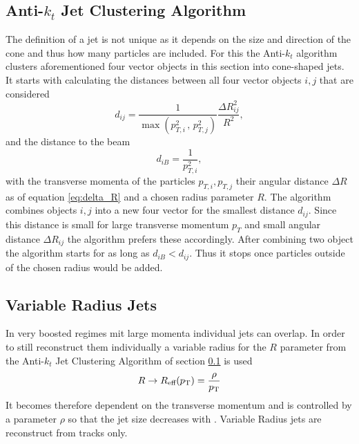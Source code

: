 \subsection{Anti-$k_t$ Jet Clustering Algorithm}\label{sec:anti_kt}
The definition of a jet is not unique as it depends on the size and direction of the cone and thus how many particles are included. For this the Anti-$k_t$ algorithm \citep{cacciari2008anti} clusters aforementioned four vector objects in this section into cone-shaped jets. It starts with calculating the distances between all four vector objects $i,j$ that are considered
\begin{equation}
    d_{ij}=\frac{1}{\max(p_{T,i}^{2}\,,\,p_{T,j}^{2})} \frac{\Delta R_{ij}^2}{R^2},
\end{equation}
and the distance to the beam 
\begin{equation}
    d_{iB}=\frac{1}{p_{T,i}^{2}},
\end{equation}
with the transverse momenta of the particles $p_{T,i},p_{T,j}$ their angular distance $\Delta R$ as of equation \ref{eq:delta_R} and a chosen radius parameter $R$. The algorithm combines objects $i,j$ into a new four vector for the smallest distance $d_{ij}$. Since this distance is small for large transverse momentum $p_T$ and small angular distance $\Delta R_{ij}$ the algorithm prefers these accordingly. After combining two object the algorithm starts for as long as $d_{iB}<d_{ij}$. Thus it stops once particles outside of the chosen radius would be added.

\subsection{Variable Radius Jets}\label{sec:vr_jets}
In very boosted regimes mit large momenta individual jets can overlap. In order to still reconstruct them individually a variable radius for the $R$ parameter from the Anti-$k_t$ Jet Clustering Algorithm of section \ref{sec:anti_kt} is used
\begin{equation}
    R\rightarrow R_\text{eff}(p_{\text{T}})=\frac{\rho}{p_{\text{T}}}
\end{equation}
It becomes therefore dependent on the transverse momentum and is controlled by a parameter $\rho$ so that the jet size decreases with \pt. Variable Radius jets are reconstruct from tracks only. 

